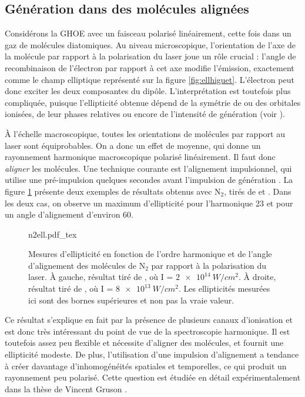 \subsection{Génération dans des molécules alignées}
Considérons la GHOE avec un faisceau polarisé linéairement, cette fois dans un gaz de molécules diatomiques. Au niveau microscopique, l'orientation de l'axe de la molécule par rapport à la polarisation du laser joue un rôle crucial : l'angle de recombinaison de l'électron par rapport à cet axe modifie l'émission, exactement comme le champ elliptique représenté sur la figure \ref{fig:ellhiguet}. L'électron peut donc exciter les deux composantes du dipôle. L'interprétation est toutefois plus compliquée, puisque l'ellipticité obtenue dépend de la symétrie de ou des orbitales ionisées, de leur phases relatives ou encore de l'intensité de génération (voir ). \par
\`{A} l'échelle macroscopique, toutes les orientations de molécules par rapport au laser sont équiprobables. On a donc un effet de moyenne, qui donne un rayonnement harmonique macroscopique polarisé linéairement. Il faut donc \textit{aligner} les molécules. Une technique courante est l'alignement impulsionnel, qui utilise une pré-impulsion quelques secondes avant l'impulsion de génération . La figure \ref{fig:n2ell} présente deux exemples de résultats obtenus avec $\text{N}_\text{2}$, tirés de  et . Dans les deux cas, on observe un maximum d'ellipticité pour l'harmonique 23 et pour un angle d'alignement d'environ 60\degres.

\begin{figure}[!ht]
\centering
\def\svgwidth{1\columnwidth}
{n2ell.pdf_tex}
\caption{Mesures d'ellipticité en fonction de l'ordre harmonique et de l'angle d'alignement des molécules de $\text{N}_\text{2}$ par rapport à la polarisation du laser. \`{A} gauche, résultat tiré de , où I = $\SI{2e14}{W/cm^2}$. \`{A} droite, résultat tiré de , où I = $\SI{8e13}{W/cm^2}$. Les ellipticités mesurées ici sont des bornes supérieures et non pas la vraie valeur.}
\label{fig:n2ell}
\end{figure}

Ce résultat s'explique en fait par la présence de plusieurs canaux d'ionisation et est donc très intéressant du point de vue de la spectroscopie harmonique. Il est toutefois assez peu flexible et nécessite d'aligner des molécules, et fournit une ellipticité modeste. De plus, l'utilisation d'une impulsion d'alignement a tendance à créer davantage d'inhomogénéités spatiales et temporelles, ce qui produit un rayonnement peu polarisé. Cette question est étudiée en détail expérimentalement dans la thèse de Vincent Gruson .

